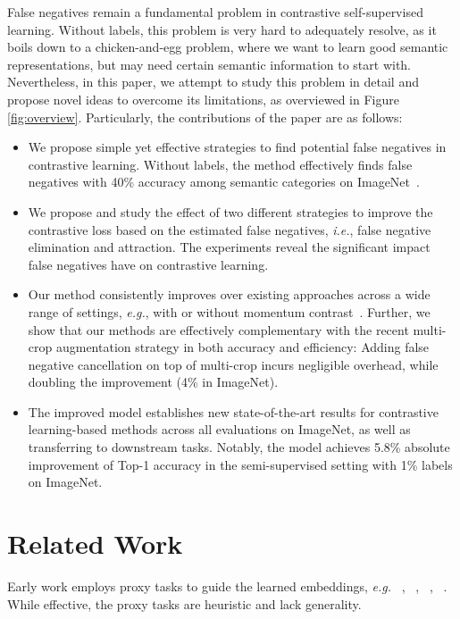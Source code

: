\documentclass[10pt,twocolumn,letterpaper]{article}
\begin{document}
False negatives remain a fundamental problem in contrastive self-supervised learning. Without labels, this problem is very hard to adequately resolve, as it boils down to a chicken-and-egg problem, where we want to learn good semantic representations, but may need certain semantic information to start with. Nevertheless, in this paper, we attempt to study this problem in detail and propose novel ideas to overcome its limitations, as overviewed in Figure \ref{fig:overview}. Particularly, the contributions of the paper are as follows:
\begin{itemize}
    \item We propose simple yet effective strategies to find potential false negatives in contrastive learning. Without  labels, the method effectively finds false negatives with 40\% accuracy among  semantic categories on ImageNet~\cite{imagenet}.
    \item We propose and study the effect of two different strategies to improve the contrastive loss based on the estimated false negatives, \emph{i.e.}, false negative elimination and attraction. The experiments reveal the significant impact false negatives have on contrastive learning.
    \item Our method consistently improves over existing approaches across a wide range of settings, \emph{e.g.}, with or without momentum contrast~\cite{he2019moco}. Further, we show that our methods are effectively complementary with the recent multi-crop augmentation strategy in both accuracy and efficiency: Adding false negative cancellation on top of multi-crop incurs negligible overhead, while doubling the improvement (4\% in ImageNet).
    \item The improved model establishes new state-of-the-art results for contrastive learning-based methods across all evaluations on ImageNet, as well as transferring to downstream tasks. Notably, the model achieves 5.8\% absolute improvement of Top-1 accuracy in the semi-supervised setting with 1\% labels on ImageNet.
\end{itemize}


 \section{Related Work}
\label{sec:related_work}


Early work employs proxy tasks to guide the learned embeddings, \emph{e.g.} ~\cite{gidaris2018unsupervised}, ~\cite{doersch2016unsupervised}, ~\cite{noroozi2017unsupervised}, ~\cite{pascal2018extracting}. While effective, the proxy tasks are heuristic and lack generality.
\end{document}
